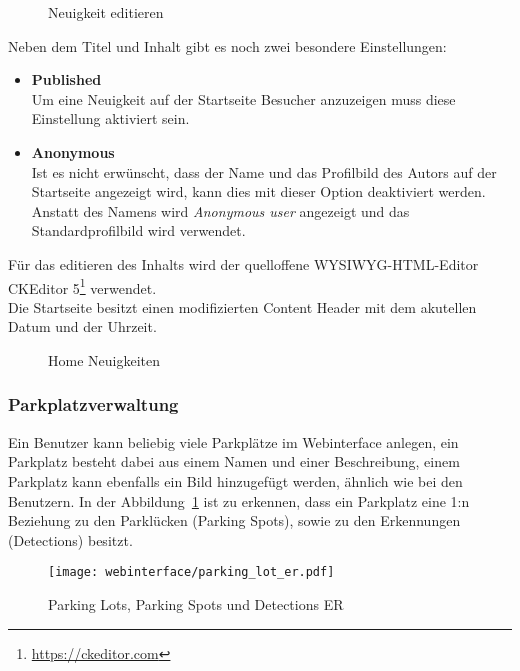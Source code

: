 \begin{figure}[H]
  \centering
  \caption{Neuigkeit editieren}
\end{figure}

Neben dem Titel und Inhalt gibt es noch zwei besondere Einstellungen:

\begin{itemize}
  \item \textbf{Published}\\
  Um eine Neuigkeit auf der Startseite Besucher anzuzeigen muss diese
  Einstellung aktiviert sein. 
  \item \textbf{Anonymous}\\
  Ist es nicht erwünscht, dass der Name und das Profilbild des Autors auf der
  Startseite angezeigt wird, kann dies mit dieser Option deaktiviert werden.
  Anstatt des Namens wird \textit{Anonymous user} angezeigt und das
  Standardprofilbild wird verwendet.
\end{itemize}

Für das editieren des Inhalts wird der quelloffene \acs*{WYSIWYG}-HTML-Editor
CKEditor 5\footnote{\url{https://ckeditor.com}} verwendet.\\

Die Startseite besitzt einen modifizierten Content Header mit dem akutellen
Datum und der Uhrzeit.

\begin{figure}[H]
  \centering
  \caption{Home Neuigkeiten}
\end{figure}

\subsubsection{Parkplatzverwaltung}
Ein Benutzer kann beliebig viele Parkplätze im Webinterface anlegen, ein
Parkplatz besteht dabei aus einem Namen und einer Beschreibung, einem Parkplatz
kann ebenfalls ein Bild hinzugefügt werden, ähnlich wie bei den Benutzern. In der
Abbildung~\ref{fig:parking_lot_er} ist zu erkennen, dass ein Parkplatz eine 1:n
Beziehung zu den Parklücken (Parking Spots), sowie zu den Erkennungen
(Detections) besitzt. 

\begin{figure}[H]
  \centering
  \texttt{[image: webinterface/parking\_lot\_er.pdf]}
  \caption{Parking Lots, Parking Spots und Detections ER}
  \label{fig:parking_lot_er}
\end{figure}

